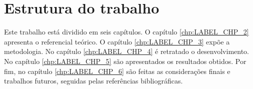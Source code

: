 \section{Estrutura do trabalho}

Este trabalho está dividido em seis capítulos. O capítulo \ref{chp:LABEL_CHP_2} apresenta o referencial teórico. O capítulo \ref{chp:LABEL_CHP_3} expõe a metodologia.
No capítulo \ref{chp:LABEL_CHP_4} é retratado o desenvolvimento. No capítulo \ref{chp:LABEL_CHP_5} são apresentados os resultados obtidos. Por fim, no capítulo \ref{chp:LABEL_CHP_6} são feitas as
considerações finais e trabalhos futuros, seguidas pelas referências bibliográficas.